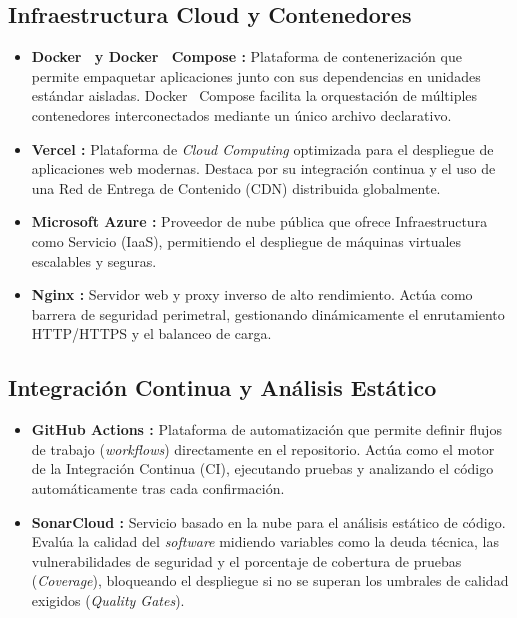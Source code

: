 \subsection{Infraestructura Cloud y Contenedores}
\begin{itemize}
    \item \textbf{Docker~\cite{docker} \cite{docker} y Docker~\cite{docker} Compose \cite{docker}:} Plataforma de contenerización que permite empaquetar aplicaciones junto con sus dependencias en unidades estándar aisladas. Docker~\cite{docker} Compose facilita la orquestación de múltiples contenedores interconectados mediante un único archivo declarativo.
    \item \textbf{Vercel \cite{vercel}:} Plataforma de \textit{Cloud Computing} optimizada para el despliegue de aplicaciones web modernas. Destaca por su integración continua y el uso de una Red de Entrega de Contenido (CDN) distribuida globalmente.
    \item \textbf{Microsoft Azure \cite{azure}:} Proveedor de nube pública que ofrece Infraestructura como Servicio (IaaS), permitiendo el despliegue de máquinas virtuales escalables y seguras.
    \item \textbf{Nginx \cite{nginx}:} Servidor web y proxy inverso de alto rendimiento. Actúa como barrera de seguridad perimetral, gestionando dinámicamente el enrutamiento HTTP/HTTPS y el balanceo de carga.
\end{itemize}

\subsection{Integración Continua y Análisis Estático}
\begin{itemize}
    \item \textbf{GitHub Actions \cite{githubactions}:} Plataforma de automatización que permite definir flujos de trabajo (\textit{workflows}) directamente en el repositorio. Actúa como el motor de la Integración Continua (CI), ejecutando pruebas y analizando el código automáticamente tras cada confirmación.
    \item \textbf{SonarCloud \cite{sonarqube}:} Servicio basado en la nube para el análisis estático de código. Evalúa la calidad del \textit{software} midiendo variables como la deuda técnica, las vulnerabilidades de seguridad y el porcentaje de cobertura de pruebas (\textit{Coverage}), bloqueando el despliegue si no se superan los umbrales de calidad exigidos (\textit{Quality Gates}).
\end{itemize}

